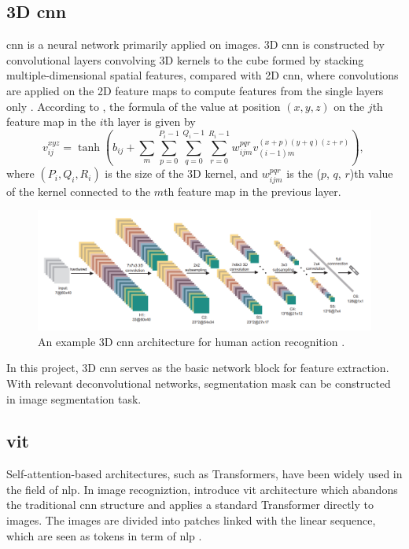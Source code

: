 \documentclass[11pt,times,oneside,openright]{eeereport}
\begin{document}
\subsection{3D \acrlong{cnn}}
\acrfull{cnn} is a neural network primarily applied
on images. 3D \acrshort{cnn} is constructed by convolutional layers convolving 3D kernels to the cube formed by stacking multiple-dimensional spatial features, compared with 2D \acrshort{cnn}, where convolutions are applied on the 2D feature maps to compute features from the single layers only \cite{ji20123d}. According to \citet{ji20123d}, the formula of the value at position \((x, y, z)\) on the $j$th feature map in the $i$th layer is given by
\begin{equation}
v_{i j}^{x y z}=\tanh \left(b_{i j}+\sum_{m} \sum_{p=0}^{P_{i}-1} \sum_{q=0}^{Q_{i}-1} \sum_{r=0}^{R_{i}-1} w_{i j m}^{p q r} v_{(i-1) m}^{(x+p)(y+q)(z+r)}\right) \text {, }
\end{equation}
where \((P_{i}, Q_{i}, R_{i})\) is the size of the 3D kernel, and \(w^{pqr}_{ijm}\) is the ($p$, $q$, $r$)th value of the kernel connected to the $m$th feature map in the previous layer.

\begin{figure}[h]
    \centering
    \includegraphics[width=\textwidth]{fig/methodology/3dcnn.png}
    \caption{An example 3D \acrshort{cnn} architecture for human action recognition \citet{ji20123d}.}
    \label{fig:3dcnn}
\end{figure}

In this project, 3D \acrshort{cnn} serves as the basic network block for feature extraction. With relevant deconvolutional networks, segmentation mask can be constructed in image segmentation task. 

\subsection{\acrlong{vit}}

Self-attention-based architectures, such as Transformers, have been widely used in the field of \acrfull{nlp}. In image recogniztion, \citet{dosovitskiy2020image} introduce \acrfull{vit} architecture which abandons the traditional \acrshort{cnn} structure and applies a standard Transformer directly to images. The images are divided into patches linked with the linear sequence, which are seen as tokens in term of \acrshort{nlp} \cite{dosovitskiy2020image}. 
\end{document}

